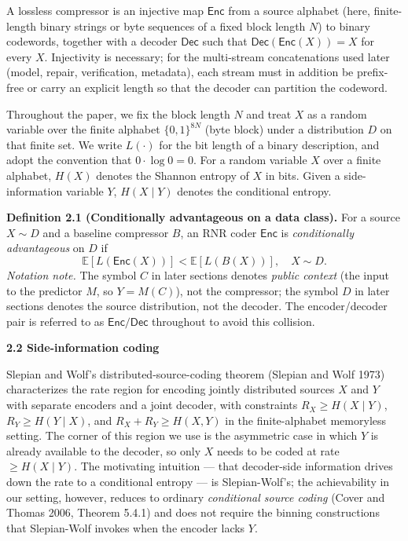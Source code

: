 \documentclass[
]{article}
\begin{document}
A lossless compressor is an injective map
$\mathsf{Enc}$ from a source alphabet (here, finite-length binary
strings or byte sequences of a fixed block length $N$) to binary
codewords, together with a decoder $\mathsf{Dec}$ such that
$\mathsf{Dec}(\mathsf{Enc}(X)) = X$ for every $X$. Injectivity is
necessary; for the multi-stream concatenations used later (model,
repair, verification, metadata), each stream must in addition be
prefix-free or carry an explicit length so that the decoder can
partition the codeword.

Throughout the paper, we fix the block length $N$ and treat $X$ as a
random variable over the finite alphabet $\{0,1\}^{8N}$ (byte block)
under a distribution $D$ on that finite set. We write $L(\cdot)$ for
the bit length of a binary description, and adopt the convention
that $0 \cdot \log 0 = 0$. For a random variable $X$ over a finite
alphabet, $H(X)$ denotes the Shannon entropy of $X$ in bits. Given
a side-information variable $Y$, $H(X \mid Y)$ denotes the
conditional entropy.

\textbf{Definition 2.1 (Conditionally advantageous on a data class).}
For a source $X \sim D$ and a baseline compressor $B$, an RNR coder
$\mathsf{Enc}$ is \emph{conditionally advantageous} on $D$ if
\[
\mathbb{E}[L(\mathsf{Enc}(X))] < \mathbb{E}[L(B(X))], \quad X \sim D.
\tag{2.1}
\]
\emph{Notation note.} The symbol $C$ in later sections denotes
\emph{public context} (the input to the predictor $M$, so
$Y = M(C)$), not the compressor; the symbol $D$ in later sections
denotes the source distribution, not the decoder. The
encoder/decoder pair is referred to as $\mathsf{Enc}/\mathsf{Dec}$
throughout to avoid this collision.

\textbf{2.2 Side-information coding}

Slepian and Wolf's distributed-source-coding theorem (Slepian and
Wolf 1973) characterizes the rate region for encoding jointly
distributed sources $X$ and $Y$ with separate encoders and a joint
decoder, with constraints $R_X \geq H(X \mid Y)$,
$R_Y \geq H(Y \mid X)$, and $R_X + R_Y \geq H(X, Y)$ in the
finite-alphabet memoryless setting. The corner of this region we use
is the asymmetric case in which $Y$ is already available to the
decoder, so only $X$ needs to be coded at rate
$\geq H(X \mid Y)$. The motivating intuition --- that decoder-side
information drives down the rate to a conditional entropy --- is
Slepian-Wolf's; the achievability in our setting, however, reduces
to ordinary \emph{conditional source coding} (Cover and Thomas 2006,
Theorem 5.4.1) and does not require the binning constructions that
Slepian-Wolf invokes when the encoder lacks $Y$.
\end{document}
